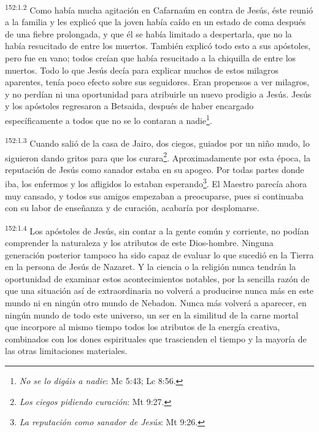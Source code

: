 \par
\textsuperscript{152:1.2} Como había mucha agitación en Cafarnaúm en contra de Jesús, éste reunió a la familia y les explicó que la joven había caído en un estado de coma después de una fiebre prolongada, y que él se había limitado a despertarla, que no la había resucitado de entre los muertos. También explicó todo esto a sus apóstoles, pero fue en vano; todos creían que había resucitado a la chiquilla de entre los muertos. Todo lo que Jesús decía para explicar muchos de estos milagros aparentes, tenía poco efecto sobre sus seguidores. Eran propensos a ver milagros, y no perdían ni una oportunidad para atribuirle un nuevo prodigio a Jesús. Jesús y los apóstoles regresaron a Betsaida, después de haber encargado específicamente a todos que no se lo contaran a nadie\footnote{\textit{No se lo digáis a nadie}: Mc 5:43; Lc 8:56.}.

\par
\textsuperscript{152:1.3} Cuando salió de la casa de Jairo, dos ciegos, guiados por un niño mudo, lo siguieron dando gritos para que los curara\footnote{\textit{Los ciegos pidiendo curación}: Mt 9:27.}. Aproximadamente por esta época, la reputación de Jesús como sanador estaba en su apogeo. Por todas partes donde iba, los enfermos y los afligidos lo estaban esperando\footnote{\textit{La reputación como sanador de Jesús}: Mt 9:26.}. El Maestro parecía ahora muy cansado, y todos sus amigos empezaban a preocuparse, pues si continuaba con su labor de enseñanza y de curación, acabaría por desplomarse.

\par
\textsuperscript{152:1.4} Los apóstoles de Jesús, sin contar a la gente común y corriente, no podían comprender la naturaleza y los atributos de este Dios-hombre. Ninguna generación posterior tampoco ha sido capaz de evaluar lo que sucedió en la Tierra en la persona de Jesús de Nazaret. Y la ciencia o la religión nunca tendrán la oportunidad de examinar estos acontecimientos notables, por la sencilla razón de que una situación así de extraordinaria no volverá a producirse nunca más en este mundo ni en ningún otro mundo de Nebadon. Nunca más volverá a aparecer, en ningún mundo de todo este universo, un ser en la similitud de la carne mortal que incorpore al mismo tiempo todos los atributos de la energía creativa, combinados con los dones espirituales que trascienden el tiempo y la mayoría de las otras limitaciones materiales.

